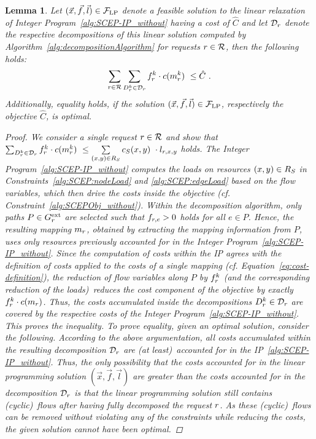 \documentclass[10pt, conference, letterpaper]{IEEEtran}
\newtheorem{lemma}[theorem]{Lemma}
\begin{document}
\begin{lemma}
\label{lem:relation-of-net-profit-in-decomposition-and-the-LP-cost}
Let $(\vec{x}, \vec{f}, \vec{l}) \in  \mathcal{F}_{\textnormal{LP}}$ denote a \emph{feasible} solution to the linear relaxation of Integer Program~\ref{alg:SCEP-IP_without} having a cost of $\hat{C}$ and let $\PotEmbeddings$ denote the respective decompositions of this linear solution computed by Algorithm~\ref{alg:decompositionAlgorithm} for requests $r \in \mathcal{R}$, then the following holds:
\begin{align}
\sum_{\req \in \requests} \sum_{\decomp \in \PotEmbeddings} \prob \cdot c(\mapping)~\leq \hat{C}~.
\end{align}
Additionally, equality holds, if the solution $(\vec{x}, \vec{f}, \vec{l}) \in  \mathcal{F}_{\textnormal{LP}}$, respectively the objective $\hat{C}$, is optimal.
\begin{proof}
We consider a single request $r \in \mathcal{R}$ and show that $\sum_{\decomp \in \PotEmbeddings} \prob \cdot c(\mapping)~\leq  \sum \limits_{(x,y) \in   \SR} \Scost(x,y)~\cdot l_{\req,x,y}$ holds.
The Integer Program~\ref{alg:SCEP-IP_without} computes the loads on resources $(x,y) \in  R_{S}$ in Constraints~\ref{alg:SCEP:nodeLoad} and \ref{alg:SCEP:edgeLoad} based on the flow variables, which then drive the costs inside the objective (cf. Constraint~\ref{alg:SCEPObj_without}). Within the decomposition algorithm, only paths $P \in G^{\textnormal{ext}}_{r}$ are selected such that $f_{r, e} > 0$ holds for all $e \in P$. Hence, the resulting mapping $m_{r}$, obtained by extracting the mapping information from $P$, uses only resources previously accounted for in the Integer Program~\ref{alg:SCEP-IP_without}. Since the computation of costs within the IP agrees with the definition of costs applied to the costs of a single mapping (cf. Equation~\ref{eq:cost-definition}), the reduction of flow variables along $P$ by $\prob$ (and the corresponding reduction of the loads)~reduces the cost component of the objective by exactly $\prob \cdot c(\map)$. Thus, the costs accumulated inside the decompositions $\decomp \in \PotEmbeddings$ are covered by the respective costs of the Integer Program~\ref{alg:SCEP-IP_without}.
This proves the inequality. To prove equality, given an optimal solution, consider the following. According to the above argumentation, all costs accumulated within the resulting decomposition $\PotEmbeddings$ are (at least)~accounted for in the IP~\ref{alg:SCEP-IP_without}. Thus, the only possibility that the costs accounted for in the linear programming solution $(\vec{x}, \vec{f}, \vec{l} )$ are greater than the costs accounted for in the decomposition $\PotEmbeddings$ is that the linear programming solution still contains (cyclic)~flows \emph{after} having fully decomposed the request $r$. As these (cyclic)~flows can be removed without violating any of the constraints while reducing the costs, the given solution cannot have been optimal.
\end{proof}
\end{lemma}
\end{document}
